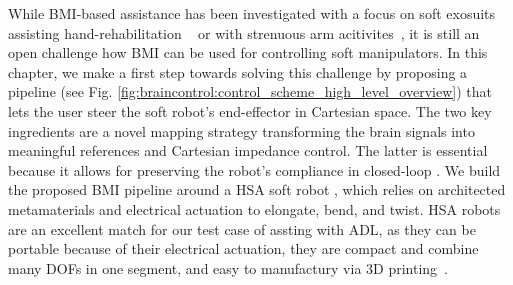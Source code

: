 While \gls{BMI}-based assistance has been investigated with a focus on 
soft exosuits assisting hand-rehabilitation ~\citep{zhang2019eeg} or with strenuous arm acitivites~\citep{tacca2022neuro}, 
it is still an open challenge how \gls{BMI} can be used for controlling soft manipulators. 
In this chapter, we make a first step towards solving this challenge by proposing a pipeline (see Fig. \ref{fig:braincontrol:control_scheme_high_level_overview}) that lets the user steer the soft robot's end-effector in Cartesian space. The two key ingredients are a novel mapping strategy transforming the brain signals into meaningful references and Cartesian impedance control. The latter is essential because it allows for preserving the robot's compliance in closed-loop \citep{della2017controlling}. We build the proposed \gls{BMI} pipeline around a \gls{HSA} soft robot \citep{stolzle2023modelling, stolzle2024experimental}, %
which relies on architected metamaterials and electrical actuation to elongate, bend, and twist.
\gls{HSA} robots are an excellent match for our test case of assting with \gls{ADL}, as they can be portable because of their electrical actuation, they are compact and combine many \glspl{DOF} in one segment, and easy to manufactury via 3D printing~\citep{truby2021recipe}.

